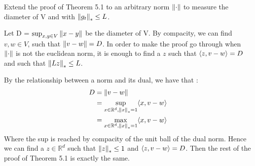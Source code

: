 \begin{exercise}[]{}
	Extend the proof of Theorem 5.1 to an arbitrary norm $ \left\|\cdot \right\| $ to measure the diameter of V and with $ \left\|g_t\right\|_{*} \leq  L $.
\end{exercise}

\begin{solution}[]
	Let D = $ \sup_{x,y\in V} \left\|x-y\right\| $ be the diameter of V. By compacity, we can find $ v,w \in V$, such that $ \left\|v-w\right\| = D $. In order to make the proof go through when $ \left\|\cdot \right\| $ is not the euclidean norm, it is enough to find a $ z $ such that $ \langle z,v-w\rangle =D $ and such that $ \left\|Lz\right\|_{*} \leq L $.

By the relationship between a norm and its dual, we have that :
\begin{align*}
	D &=\left\|v-w\right\|\\
	  &= \sup_{x\in \mathbb{R}^d, \left\|x\right\|_{*}=1}\langle x,v-w\rangle\\
	  &= \max_{x\in \mathbb{R}^d, \left\|x\right\|_{*}=1}\langle x,v-w\rangle
\end{align*}
Where the sup is reached by compacity of the unit ball of the dual norm. Hence we can find a $ z \in \mathbb{R}^d $ such that $ \left\|z\right\|_{*} \leq 1 $ and $ \langle z,v-w\rangle = D $. Then the rest of the proof of Theorem 5.1 is exactly the same.

\end{solution}
